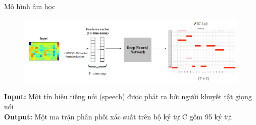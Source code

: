 \documentclass[10pt,a4paper,openany]{beamer}
\begin{document}
	\begin{frame}{Mô hình âm học}  \pause
		\begin{figure}[htbp]
			\centerline{\includegraphics[scale=0.35]{charts/architecture_21.png}}
			\label{fig_architecture_overview}
		\end{figure}  \pause
		\textbf{Input:} Một tín hiệu tiếng nói (speech) được phát ra bởi người khuyết tật giọng nói \\  \pause
		\textbf{Output:} Một ma trận phân phối xác suất trên bộ ký tự C gồm 95 ký tự. 
	\end{frame}
	
\end{document}
